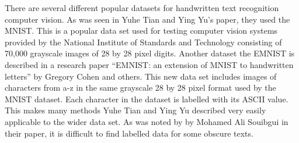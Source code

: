\documentclass[12pt]{article}
\begin{document}
There are several different popular datasets for handwritten text recognition computer vision. As was seen in Yuhe Tian and Ying Yu’s paper, they used the MNIST. This is a popular data set used for testing computer vision systems provided by the National Institute of Standards and Technology consisting of 70,000 grayscale images of 28 by 28 pixel digits. Another dataset the EMNIST is described in a research paper “EMNIST: an extension of MNIST to handwritten letters” by Gregory Cohen and others. This new data set includes images of characters from a-z in the same grayscale 28 by 28 pixel format used by the MNIST dataset. Each character in the dataset is labelled with its ASCII value.  This makes many methods Yuhe Tian and Ying Yu described very easily applicable to the wider data set. As was noted by by Mohamed Ali Souibgui in their paper, it is difficult to find labelled data for some obscure texts.
\end{document}
